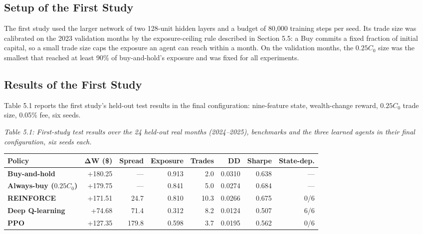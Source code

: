 \subsection{Setup of the First Study}

The first study used the larger network of two 128-unit hidden layers and a
budget of 80,000 training steps per seed. Its trade size was calibrated
on the 2023 validation months by the exposure-ceiling rule described in
Section 5.5: a Buy commits a fixed fraction of initial capital, so a
small trade size caps the exposure an agent can reach within a month.
On the validation months, the \(0.25C_{0}\) size was the smallest that
reached at least 90\% of buy-and-hold's exposure and was fixed for all
experiments.

\subsection{Results of the First Study}

Table 5.1 reports the first study's held-out test results in the final
configuration: nine-feature state, wealth-change reward, \(0.25C_{0}\)
trade size, 0.05\% fee, six seeds.

\emph{Table 5.1: First-study test results over the 24 held-out real
months (2024--2025), benchmarks and the three learned agents in their
final configuration, six seeds each.}

{\def\LTcaptype{none}
\begin{longtable}[]{@{}lrrrrrrr@{}}
\toprule\noalign{}
\textbf{Policy} & \textbf{ΔW (\$)} & \textbf{Spread} & \textbf{Exposure}
& \textbf{Trades} & \textbf{DD} & \textbf{Sharpe} & \textbf{State-dep.} \\
\midrule\noalign{}
\endhead
\bottomrule\noalign{}
\endlastfoot
\textbf{Buy-and-hold} & +180.25 & --- & 0.913 & 2.0 & 0.0310 & 0.638 & --- \\
\rowsep
\textbf{Always-buy (\(0.25C_{0}\))} & +179.75 & --- & 0.841 & 5.0 & 0.0274 & 0.684 & --- \\
\rowsep
\textbf{REINFORCE} & +171.51 & 24.7 & 0.810 & 10.3 & 0.0266 & 0.675 & 0/6 \\
\rowsep
\textbf{Deep Q-learning} & +74.68 & 71.4 & 0.312 & 8.2 & 0.0124 & 0.507 & 6/6 \\
\rowsep
\textbf{PPO} & +127.35 & 179.8 & 0.598 & 3.7 & 0.0195 & 0.562 & 0/6 \\
\end{longtable}
}

